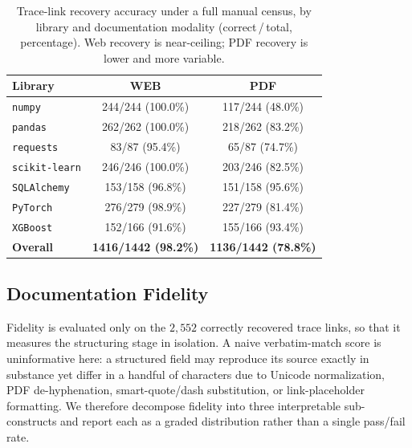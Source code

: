 \begin{table}[t]
\centering
\caption{Trace-link recovery accuracy under a full manual census, by library
and documentation modality (correct\,/\,total, percentage). Web recovery is
near-ceiling; PDF recovery is lower and more variable.}
\label{tab:trace-accuracy}
\begin{tabular}{lcc}
\toprule
Library & WEB & PDF \\
\midrule
\texttt{numpy}       & 244/244 (100.0\%) & 117/244 (48.0\%) \\
\texttt{pandas}      & 262/262 (100.0\%) & 218/262 (83.2\%) \\
\texttt{requests}    & 83/87 (95.4\%)    & 65/87 (74.7\%) \\
\texttt{scikit-learn}& 246/246 (100.0\%) & 203/246 (82.5\%) \\
\texttt{SQLAlchemy}  & 153/158 (96.8\%)  & 151/158 (95.6\%) \\
\texttt{PyTorch}     & 276/279 (98.9\%)  & 227/279 (81.4\%) \\
\texttt{XGBoost}     & 152/166 (91.6\%)  & 155/166 (93.4\%) \\
\midrule
\textbf{Overall}     & \textbf{1416/1442 (98.2\%)} & \textbf{1136/1442 (78.8\%)} \\
\bottomrule
\end{tabular}
\end{table}

\subsection{Documentation Fidelity}
\label{sec:eval-fidelity}

Fidelity is evaluated only on the $2{,}552$ correctly recovered trace links, so
that it measures the structuring stage in isolation. A naive verbatim-match
score is uninformative here: a structured field may reproduce its source exactly
in substance yet differ in a handful of characters due to Unicode normalization,
PDF de-hyphenation, smart-quote/dash substitution, or link-placeholder
formatting. We therefore decompose fidelity into three interpretable
sub-constructs and report each as a graded distribution rather than a single
pass/fail rate.

